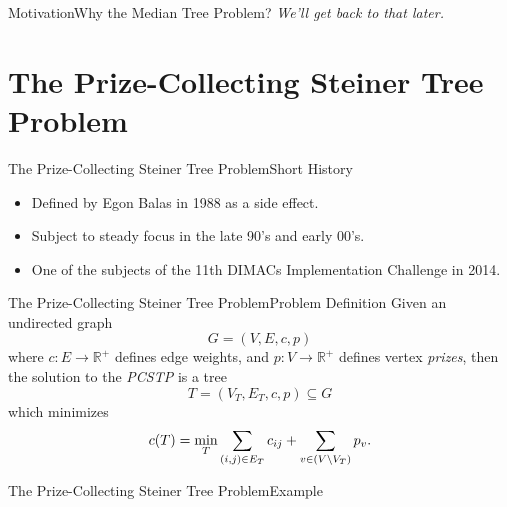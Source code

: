 \documentclass[rgb,dvipsnames]{beamer}
\newcommand{\RR}{\mathbb{R}}      %
\begin{document}
\begin{frame}{Motivation}{Why the Median Tree Problem?}
  \pause
  \textit{We'll get back to that later.}
\end{frame}
\section{The Prize-Collecting Steiner Tree Problem}
\begin{frame}{The Prize-Collecting Steiner Tree Problem}{Short History}
  \begin{itemize}
  \item Defined by Egon Balas in 1988 as a side effect.
  \item Subject to steady focus in the late 90's and early 00's.
  \item One of the subjects of the 11th DIMACs Implementation Challenge in 2014.
  \end{itemize}
\end{frame}
\begin{frame}{The Prize-Collecting Steiner Tree Problem}{Problem Definition}
 Given an undirected graph
\[G = (V, E, c, p)\]
where $c: E \to \RR^+$ defines edge weights,
and $p: V \to \RR^+$ defines vertex \textit{prizes}, then the solution to the
\textit{PCSTP} is a tree
\[T = (V_T, E_T, c, p) \subseteq G\]
which minimizes
\[c(T) = \min_T \sum_{(i,j) \in E_T} c_{ij} + \sum_{v\in (V \setminus V_T)} p_v \textnormal{.} \]
\end{frame}

\begin{frame}{The Prize-Collecting Steiner Tree Problem}{Example}
  \centering
\end{frame}
\end{document}
